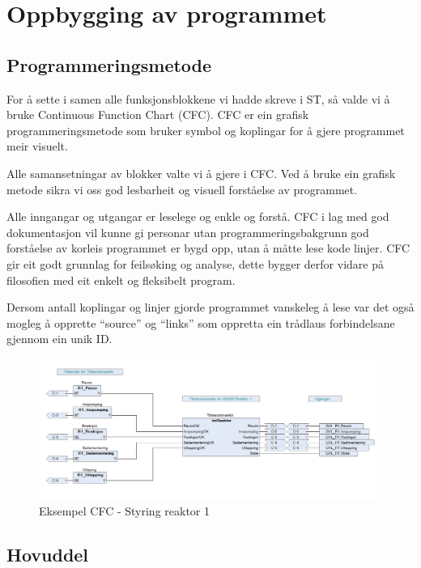 \newpage
\section{Oppbygging av programmet}
\thispagestyle{fancy}

\subsection{Programmeringsmetode}
For å sette i samen alle funksjonsblokkene vi hadde skreve i \gls{ST}, så valde vi å bruke  Continuous Function Chart (\gls{CFC}).
\gls{CFC} er ein grafisk programmeringsmetode som bruker symbol og koplingar for å gjere programmet  meir visuelt.

Alle samansetningar av blokker valte vi å gjere i \gls{CFC}. Ved å bruke ein grafisk metode sikra vi oss god lesbarheit og
visuell forståelse av programmet. 

Alle inngangar og utgangar er leselege og enkle og forstå. \gls{CFC} i lag med god dokumentasjon vil kunne gi personar utan programmeringsbakgrunn
god forståelse av korleis programmet er bygd opp, utan å måtte lese kode linjer.
\gls{CFC} gir eit godt grunnlag for feilsøking og analyse, dette bygger derfor vidare på filosofien med eit enkelt og fleksibelt program.

Dersom antall koplingar og linjer gjorde programmet vanskeleg å lese var det også
mogleg å opprette ``source'' og ``links'' som oppretta ein trådlaus forbindelsane gjennom ein unik ID.

\begin{figure}[htbp]
    \centering
    \includegraphics[width=1\textwidth]{Bilder/ReaktorPRG.png}
    \caption{Eksempel \gls{CFC} - Styring reaktor 1}\label{fig:CFCReaktor}
\end{figure}

\newpage

\subsection{Hovuddel}

